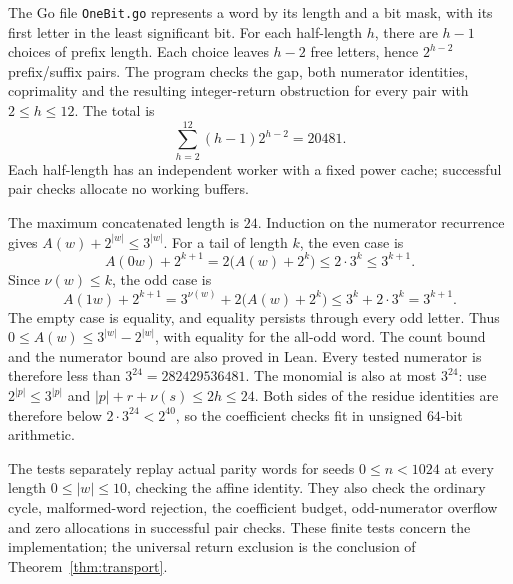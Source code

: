 \documentclass[11pt,letterpaper]{article}
\begin{document}
The Go file \texttt{OneBit.go} represents a word by its length and a bit mask,
with its first letter in the least significant bit. For each half-length
\(h\), there are \(h-1\) choices of prefix length. Each choice leaves
\(h-2\) free letters, hence \(2^{h-2}\) prefix/suffix pairs. The program
checks the gap, both numerator identities, coprimality and the resulting
integer-return obstruction for every pair with \(2\le h\le12\). The total is
\[
\sum_{h=2}^{12}(h-1)2^{h-2}=20481.
\]
Each half-length has an independent worker with a fixed power cache; successful
pair checks allocate no working buffers.

The maximum concatenated length is \(24\). Induction on the numerator
recurrence gives \(A(w)+2^{|w|}\le3^{|w|}\). For a tail of length \(k\),
the even case is
\[
A(0w)+2^{k+1}=2\bigl(A(w)+2^k\bigr)\le2\cdot3^k\le3^{k+1}.
\]
Since \(\nu(w)\le k\), the odd case is
\[
A(1w)+2^{k+1}=3^{\nu(w)}+2\bigl(A(w)+2^k\bigr)
\le3^k+2\cdot3^k=3^{k+1}.
\]
The empty case is equality, and equality persists through every odd letter.
Thus \(0\le A(w)\le3^{|w|}-2^{|w|}\), with equality for the all-odd word.
The count bound and the numerator bound are also proved in Lean.
Every tested numerator is therefore less than
\(3^{24}=282429536481\). The monomial is also at most \(3^{24}\): use
\(2^{|p|}\le3^{|p|}\) and
\(|p|+r+\nu(s)\le2h\le24\). Both sides of the residue identities
are therefore below \(2\cdot3^{24}<2^{40}\), so the coefficient checks fit
in unsigned \(64\)-bit arithmetic.

The tests separately replay actual parity words for seeds \(0\le n<1024\)
at every length \(0\le |w|\le10\), checking the affine identity. They also
check the ordinary cycle, malformed-word rejection, the coefficient budget,
odd-numerator overflow and zero allocations in successful pair checks. These
finite tests concern the implementation; the universal return exclusion is
the conclusion of Theorem~\ref{thm:transport}.
\end{document}

